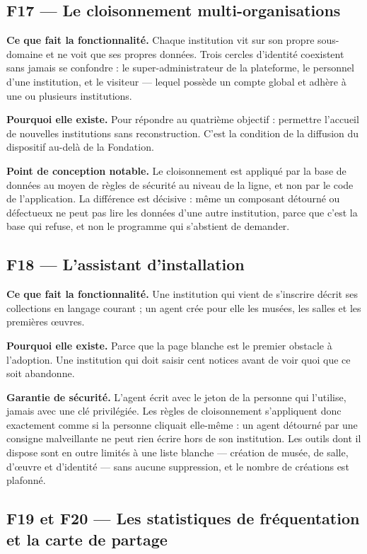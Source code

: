 \subsection{F17 — Le cloisonnement multi-organisations}

\textbf{Ce que fait la fonctionnalité.} Chaque institution vit sur son propre
sous-domaine et ne voit que ses propres données. Trois cercles d'identité
coexistent sans jamais se confondre : le super-administrateur de la plateforme,
le personnel d'une institution, et le visiteur — lequel possède un compte global
et adhère à une ou plusieurs institutions.

\textbf{Pourquoi elle existe.} Pour répondre au quatrième objectif : permettre
l'accueil de nouvelles institutions sans reconstruction. C'est la condition de
la diffusion du dispositif au-delà de la Fondation.

\textbf{Point de conception notable.} Le cloisonnement est appliqué par la base
de données au moyen de règles de sécurité au niveau de la ligne, et non par le
code de l'application. La différence est décisive : même un composant détourné
ou défectueux ne peut pas lire les données d'une autre institution, parce que
c'est la base qui refuse, et non le programme qui s'abstient de demander.

\subsection{F18 — L'assistant d'installation}

\textbf{Ce que fait la fonctionnalité.} Une institution qui vient de s'inscrire
décrit ses collections en langage courant ; un agent crée pour elle les musées,
les salles et les premières œuvres.

\textbf{Pourquoi elle existe.} Parce que la page blanche est le premier obstacle
à l'adoption. Une institution qui doit saisir cent notices avant de voir quoi
que ce soit abandonne.

\textbf{Garantie de sécurité.} L'agent écrit avec le jeton de la personne qui
l'utilise, jamais avec une clé privilégiée. Les règles de cloisonnement
s'appliquent donc exactement comme si la personne cliquait elle-même : un agent
détourné par une consigne malveillante ne peut rien écrire hors de son
institution. Les outils dont il dispose sont en outre limités à une liste
blanche — création de musée, de salle, d'œuvre et d'identité — sans aucune
suppression, et le nombre de créations est plafonné.

\subsection{F19 et F20 — Les statistiques de fréquentation et la carte de partage}

